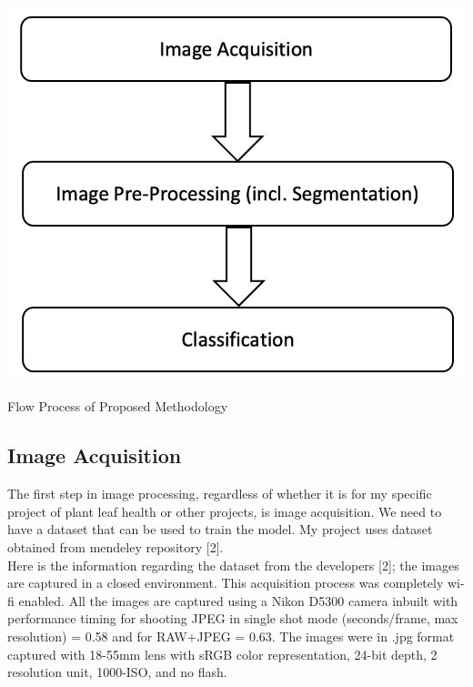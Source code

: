 \documentclass[twocolumn,10pt]{article}
\makeatletter
\newenvironment{figurehere}
  {\def\@captype{figure}}
  {}
\makeatother
\begin{document}
\begin{multicols}{2}
\begin{flushleft}
	\begin{figurehere}
		\centering
		\includegraphics[width=\linewidth]{proposed_methodology2.png}
		\caption{Flow Process of Proposed Methodology}
		\label{fig:fig3}
	\end{figurehere}
	
	\subsection{Image Acquisition}
	The first step in image processing, regardless of whether it is for my specific project of plant leaf health or other projects, is image acquisition. We need to have a dataset that can be used to train the model. My project uses dataset obtained from mendeley repository [2].\\
	Here is the information regarding the dataset from the developers [2]; the images are captured in a closed environment. This acquisition process was completely wi-fi enabled. All the images are captured using a Nikon D5300 camera inbuilt with performance timing for shooting JPEG in single shot mode (seconds/frame, max resolution) = 0.58 and for RAW+JPEG = 0.63. The images were in .jpg format captured with 18-55mm lens with sRGB color representation, 24-bit depth, 2 resolution unit, 1000-ISO, and no flash.
	

\end{flushleft}
\end{multicols}
\end{document}
